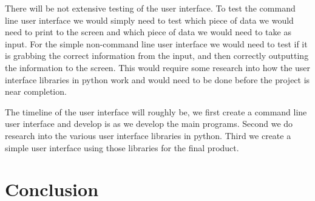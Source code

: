 \documentclass[10pt, draftclsnofoot, onecolumn]{IEEEtran}
\begin{document}
There will be not extensive testing of the user interface. To test the command line user interface we would simply need to test which piece of data we would need to print to the screen and which piece of data we would need to take as input. For the simple non-command line user interface we would need to test if it is grabbing the correct information from the input, and then correctly outputting the information to the screen. This would require some research into how the user interface libraries in python work and would need to be done before the project is near completion.

The timeline of the user interface will roughly be, we first create a command line user interface and develop is as we develop the main programs. Second we do research into the various user interface libraries in python. Third we create a simple user interface using those libraries for the final product.

\section{Conclusion}
\end{document}
